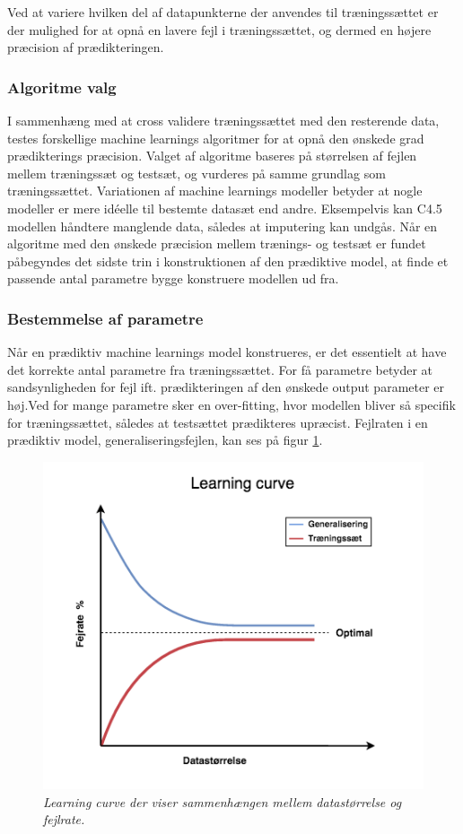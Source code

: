 \noindent
Ved at variere hvilken del af datapunkterne der anvendes til træningssættet er der mulighed for at opnå en lavere fejl i træningssættet, og dermed en højere præcision af prædikteringen.\cite{Kuhn2013} 


\subsubsection{Algoritme valg} \label{algovalg}
I sammenhæng med at cross validere træningssættet med den resterende data, testes forskellige machine learnings algoritmer for at opnå den ønskede grad prædikterings præcision.\cite{Kuhn2013} Valget af algoritme baseres på størrelsen af fejlen mellem træningssæt og testsæt, og vurderes på samme grundlag som træningssættet. Variationen af machine learnings modeller betyder at nogle modeller er mere idéelle til bestemte datasæt end andre. Eksempelvis kan C4.5 modellen håndtere manglende data, således at imputering kan undgås. Når en algoritme med den ønskede præcision mellem trænings- og testsæt er fundet påbegyndes det sidste trin i konstruktionen af den prædiktive model, at finde et passende antal parametre bygge konstruere modellen ud fra.\cite{DIKU2010}    

\subsubsection{Bestemmelse af parametre}
Når en prædiktiv machine learnings model konstrueres, er det essentielt at have det korrekte antal parametre fra træningssættet. For få parametre betyder at sandsynligheden for fejl ift. prædikteringen af den ønskede output parameter er høj.Ved for mange parametre sker en over-fitting, hvor modellen bliver så specifik for træningssættet, således at testsættet prædikteres upræcist.\cite{DIKU2010} Fejlraten i en prædiktiv model, generaliseringsfejlen, kan ses på figur \ref{fig:genfejl}.


\begin{figure}[H]
	\centering
	\includegraphics[scale=.8]{figures/genfejl.png}
	\caption{\textit{Learning curve der viser sammenhængen mellem datastørrelse og fejlrate.}\cite{Kuhn2013}}
	\label{fig:genfejl}
\end{figure}

